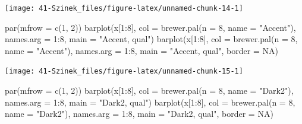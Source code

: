 \documentclass[
]{book}
\newenvironment{Shaded}{\begin{snugshade}}{\end{snugshade}}
\newcommand{\AttributeTok}[1]{\textcolor[rgb]{0.77,0.63,0.00}{#1}}
\newcommand{\ConstantTok}[1]{\textcolor[rgb]{0.00,0.00,0.00}{#1}}
\newcommand{\DecValTok}[1]{\textcolor[rgb]{0.00,0.00,0.81}{#1}}
\newcommand{\FunctionTok}[1]{\textcolor[rgb]{0.00,0.00,0.00}{#1}}
\newcommand{\NormalTok}[1]{#1}
\newcommand{\SpecialCharTok}[1]{\textcolor[rgb]{0.00,0.00,0.00}{#1}}
\newcommand{\StringTok}[1]{\textcolor[rgb]{0.31,0.60,0.02}{#1}}
\begin{document}
\begin{center}\texttt{[image: 41-Szinek\_files/figure-latex/unnamed-chunk-14-1]} \end{center}

\begin{Shaded}
\begin{Highlighting}[]
\FunctionTok{par}\NormalTok{(}\AttributeTok{mfrow =} \FunctionTok{c}\NormalTok{(}\DecValTok{1}\NormalTok{, }\DecValTok{2}\NormalTok{))}
\FunctionTok{barplot}\NormalTok{(x[}\DecValTok{1}\SpecialCharTok{:}\DecValTok{8}\NormalTok{], }\AttributeTok{col =} \FunctionTok{brewer.pal}\NormalTok{(}\AttributeTok{n =} \DecValTok{8}\NormalTok{, }\AttributeTok{name =} \StringTok{"Accent"}\NormalTok{), }\AttributeTok{names.arg =} \DecValTok{1}\SpecialCharTok{:}\DecValTok{8}\NormalTok{, }\AttributeTok{main =} \StringTok{"Accent, qual"}\NormalTok{)}
\FunctionTok{barplot}\NormalTok{(x[}\DecValTok{1}\SpecialCharTok{:}\DecValTok{8}\NormalTok{], }\AttributeTok{col =} \FunctionTok{brewer.pal}\NormalTok{(}\AttributeTok{n =} \DecValTok{8}\NormalTok{, }\AttributeTok{name =} \StringTok{"Accent"}\NormalTok{), }\AttributeTok{names.arg =} \DecValTok{1}\SpecialCharTok{:}\DecValTok{8}\NormalTok{, }\AttributeTok{main =} \StringTok{"Accent, qual"}\NormalTok{, }
    \AttributeTok{border =} \ConstantTok{NA}\NormalTok{)}
\end{Highlighting}
\end{Shaded}

\begin{center}\texttt{[image: 41-Szinek\_files/figure-latex/unnamed-chunk-15-1]} \end{center}

\begin{Shaded}
\begin{Highlighting}[]
\FunctionTok{par}\NormalTok{(}\AttributeTok{mfrow =} \FunctionTok{c}\NormalTok{(}\DecValTok{1}\NormalTok{, }\DecValTok{2}\NormalTok{))}
\FunctionTok{barplot}\NormalTok{(x[}\DecValTok{1}\SpecialCharTok{:}\DecValTok{8}\NormalTok{], }\AttributeTok{col =} \FunctionTok{brewer.pal}\NormalTok{(}\AttributeTok{n =} \DecValTok{8}\NormalTok{, }\AttributeTok{name =} \StringTok{"Dark2"}\NormalTok{), }\AttributeTok{names.arg =} \DecValTok{1}\SpecialCharTok{:}\DecValTok{8}\NormalTok{, }\AttributeTok{main =} \StringTok{"Dark2, qual"}\NormalTok{)}
\FunctionTok{barplot}\NormalTok{(x[}\DecValTok{1}\SpecialCharTok{:}\DecValTok{8}\NormalTok{], }\AttributeTok{col =} \FunctionTok{brewer.pal}\NormalTok{(}\AttributeTok{n =} \DecValTok{8}\NormalTok{, }\AttributeTok{name =} \StringTok{"Dark2"}\NormalTok{), }\AttributeTok{names.arg =} \DecValTok{1}\SpecialCharTok{:}\DecValTok{8}\NormalTok{, }\AttributeTok{main =} \StringTok{"Dark2, qual"}\NormalTok{, }
    \AttributeTok{border =} \ConstantTok{NA}\NormalTok{)}
\end{Highlighting}
\end{Shaded}
\end{document}

